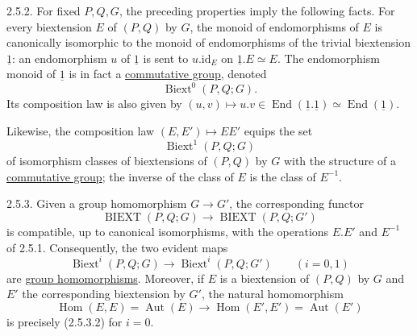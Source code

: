 2.5.2. For fixed $P,Q,G$, the preceding properties imply the
following facts. For every biextension $E$ of $(P,Q)$ by $G$, the
monoid of endomorphisms of $E$ is canonically isomorphic to the monoid
of endomorphisms of the trivial biextension $\underline 1$: an
endomorphism $u$ of $\underline 1$ is sent to
$u.\mathrm{id}_E$ on $\underline 1.E\simeq E$. The endomorphism monoid
of $\underline 1$ is in fact a \underline{commutative group}, denoted
\begin{equation}\tag{2.5.2.1}
 \operatorname{Biext}^{0}(P,Q;G).
\end{equation}
Its composition law is also given by
$(u,v)\mapsto u.v\in
\operatorname{End}(\underline 1.\underline 1)
\simeq\operatorname{End}(\underline 1)$.

Likewise, the composition law $(E,E')\mapsto EE'$ equips the set
\begin{equation}\tag{2.5.2.2}
 \operatorname{Biext}^{1}(P,Q;G)
\end{equation}
of isomorphism classes of biextensions of $(P,Q)$ by $G$ with the
structure of a \underline{commutative group}; the inverse of the class
of $E$ is the class of $E^{-1}$.

2.5.3. Given a group homomorphism $G\longrightarrow G'$, the
corresponding functor
\begin{equation}\tag{2.5.3.1}
 \operatorname{BIEXT}(P,Q;G)
 \longrightarrow
 \operatorname{BIEXT}(P,Q;G')
\end{equation}
is compatible, up to canonical isomorphisms, with the operations
$E.E'$ and $E^{-1}$ of 2.5.1. Consequently, the two evident maps
\begin{equation}\tag{2.5.3.2}
 \operatorname{Biext}^{i}(P,Q;G)
 \longrightarrow
 \operatorname{Biext}^{i}(P,Q;G')
 \qquad(i=0,1)
\end{equation}
are \underline{group homomorphisms}. Moreover, if $E$ is a
biextension of $(P,Q)$ by $G$ and $E'$ the corresponding
biextension by $G'$, the natural homomorphism
\begin{equation}\tag{2.5.3.3}
 \operatorname{Hom}(E,E)=\operatorname{Aut}(E)
 \longrightarrow
 \operatorname{Hom}(E',E')=\operatorname{Aut}(E')
\end{equation}
is precisely (2.5.3.2) for $i=0$.

